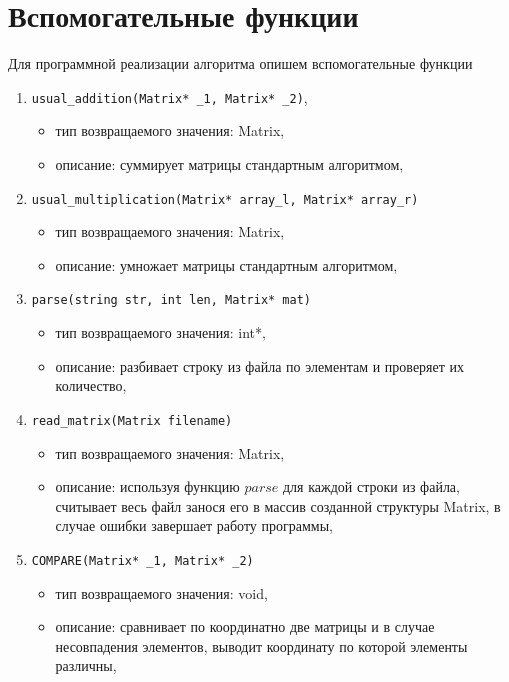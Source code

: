 \section{Вспомогательные функции} 
Для программной реализации алгоритма опишем вспомогательные функции
\begin{enumerate}
	\item \texttt{usual\_addition(Matrix* \_1, Matrix* \_2)},
	\begin{itemize}
		\item тип возвращаемого значения: Matrix,
		\item описание: суммирует матрицы стандартным алгоритмом,
	\end{itemize}
	
	\item \texttt{usual\_multiplication(Matrix* array\_l, Matrix* array\_r)}
	\begin{itemize}
		\item тип возвращаемого значения: Matrix,
		\item описание: умножает матрицы стандартным алгоритмом,
	\end{itemize}
	
	\item \texttt{parse(string str, int len, Matrix* mat)}
	\begin{itemize}
		\item тип возвращаемого значения: int*,
		\item описание: разбивает строку из файла по элементам и проверяет их количество,
	\end{itemize}
	
	\item \texttt{read\_matrix(Matrix filename)}
	\begin{itemize}
		\item тип возвращаемого значения: Matrix,
		\item описание: используя функцию $parse$ для каждой строки из файла, считывает весь файл занося его в массив созданной структуры Matrix, в случае ошибки завершает работу программы,
	\end{itemize}
	
	\item \texttt{COMPARE(Matrix* \_1, Matrix* \_2)}
	\begin{itemize}
		\item тип возвращаемого значения: void,
		\item описание: сравнивает по координатно две матрицы и в случае несовпадения элементов, выводит координату по которой элементы различны,
	\end{itemize}
	\newpage
\end{enumerate}
